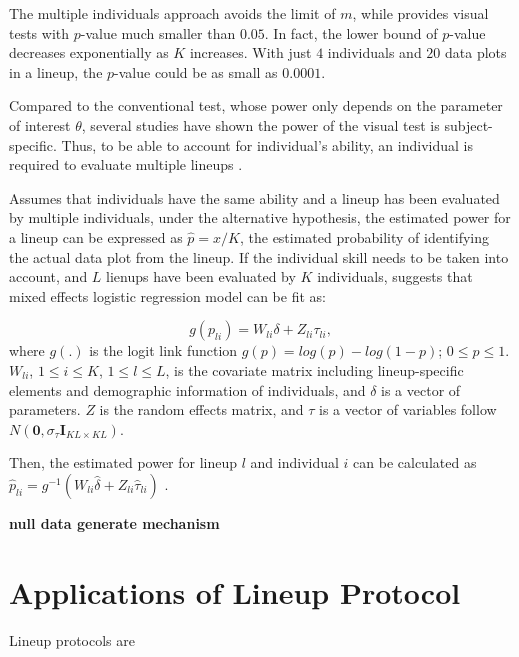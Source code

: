 \documentclass{monashthesis}
\theoremstyle{definition}
\theoremstyle{definition}
\theoremstyle{definition}
\theoremstyle{definition}
\theoremstyle{remark}
\begin{document}
The multiple individuals approach avoids the limit of \(m\), while provides visual tests with \(p\)-value much smaller than \(0.05\). In fact, the lower bound of \(p\)-value decreases exponentially as \(K\) increases. With just \(4\) individuals and \(20\) data plots in a lineup, the \(p\)-value could be as small as \(0.0001\).

Compared to the conventional test, whose power only depends on the parameter of interest \(\theta\), several studies \autocites[see][]{hofmann_graphical_2012,majumder_validation_2013,majumder_human_2014,roy_chowdhury_using_2015,loy_variations_2016} have shown the power of the visual test is subject-specific. Thus, to be able to account for individual's ability, an individual is required to evaluate multiple lineups \autocite{majumder_validation_2013}.

Assumes that individuals have the same ability and a lineup has been evaluated by multiple individuals, under the alternative hypothesis, the estimated power for a lineup can be expressed as \(\hat{p} = x/K\), the estimated probability of identifying the actual data plot from the lineup. If the individual skill needs to be taken into account, and \(L\) lienups have been evaluated by \(K\) individuals, \textcite{majumder_validation_2013} suggests that mixed effects logistic regression model can be fit as:

\[g(p_{li}) = W_{li}\delta + Z_{li}\tau_{li},\]
where \(g(.)\) is the logit link function \(g(p) = log(p) - log(1-p)\); \(0 \leq p \leq 1\). \(W_{li}\), \(1 \leq i \leq K\), \(1 \leq l \leq L\), is the covariate matrix including lineup-specific elements and demographic information of individuals, and \(\delta\) is a vector of parameters. \(Z\) is the random effects matrix, and \(\tau\) is a vector of variables follow \(N(\boldsymbol{0},\sigma_{\tau}\boldsymbol{I}_{KL\times KL})\).

Then, the estimated power for lineup \(l\) and individual \(i\) can be calculated as \(\hat{p}_{li} = g^{-1}(W_{li}\hat{\delta} + Z_{li}\hat{\tau}_{li})\) \autocite{majumder_validation_2013}.

\textbf{null data generate mechanism}

\hypertarget{applications-of-lineup-protocol}{%
\section{Applications of Lineup Protocol}\label{applications-of-lineup-protocol}}

Lineup protocols are
\end{document}
